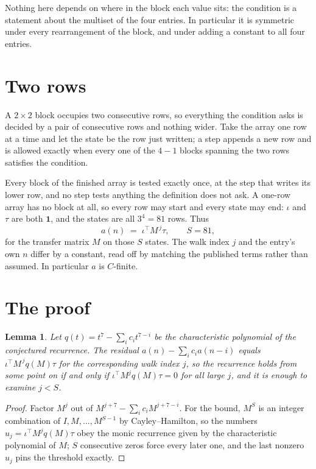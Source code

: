 \documentclass[11pt,a4paper]{article}
\theoremstyle{plain}
\newtheorem{lemma}[theorem]{Lemma}
\theoremstyle{definition}
\begin{document}
Nothing here depends on where in the block each value sits: the condition is a statement about
the multiset of the four entries. In particular it is symmetric under every rearrangement of
the block, and under adding a constant to all four entries.

\section{Two rows}

A $2\times2$ block occupies two consecutive rows, so everything the condition asks is decided
by a pair of consecutive rows and nothing wider. Take the array one row at a time and let the
state be the row just written; a step appends a new row and is allowed exactly when every one
of the $4-1$ blocks spanning the two rows satisfies the condition.

Every block of the finished array is tested exactly once, at the step that writes its lower
row, and no step tests anything the definition does not ask. A one-row array has no block at
all, so every row may start and every state may end: $\iota$ and $\tau$ are both
$\mathbf{1}$, and the states are all $3^{4}=81$ rows. Thus
\[
a(n)\;=\;\iota^{\!\top}M^{\,j}\tau ,\qquad S=81,
\]
for the transfer matrix $M$ on those $S$ states. The walk index $j$ and the entry's own $n$
differ by a constant, read off by matching the published terms rather than assumed. In
particular $a$ is $C$-finite.

\section{The proof}

\begin{lemma}\label{lem:crit}
Let $q(t)=t^{7}-\sum_i c_it^{7-i}$ be the characteristic polynomial of the
conjectured recurrence. The residual $a(n)-\sum_ic_ia(n-i)$ equals
$\iota^{\!\top}M^{\,j}q(M)\tau$ for the corresponding walk index $j$, so the recurrence
holds from some point on if and only if $\iota^{\!\top}M^{j}q(M)\tau=0$ for all large $j$,
and it is enough to examine $j<S$.
\end{lemma}

\begin{proof}
Factor $M^{j}$ out of $M^{j+7}-\sum_ic_iM^{j+7-i}$. For the bound, $M^{S}$
is an integer combination of $I,M,\dots,M^{S-1}$ by Cayley--Hamilton, so the numbers
$u_j=\iota^{\!\top}M^{j}q(M)\tau$ obey the monic recurrence given by the characteristic
polynomial of $M$; $S$ consecutive zeros force every later one, and the last nonzero $u_j$
pins the threshold exactly.
\end{proof}
\end{document}
